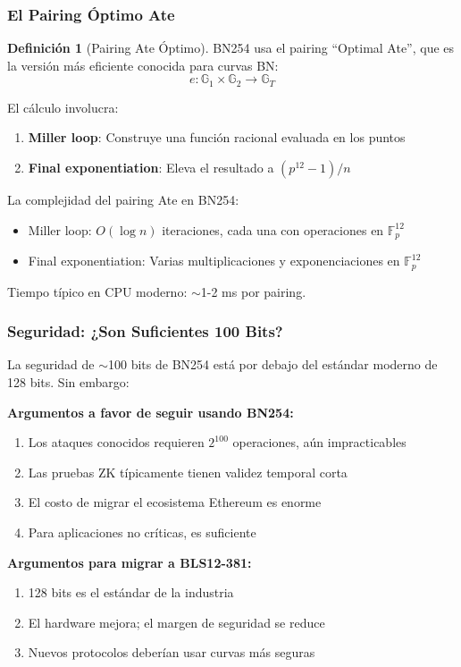 \documentclass[11pt,a4paper,twoside,openright]{book}
\theoremstyle{definition}
\newtheorem{definition}{Definición}[chapter]
\theoremstyle{plain}
\theoremstyle{remark}
\newcommand{\Fp}{\mathbb{F}_p}
\newcommand{\G}{\mathbb{G}}
\begin{document}
\subsubsection{El Pairing Óptimo Ate}

\begin{definition}[Pairing Ate Óptimo]
BN254 usa el pairing ``Optimal Ate'', que es la versión más eficiente conocida para curvas BN:
\[ e: \G_1 \times \G_2 \to \G_T \]

El cálculo involucra:
\begin{enumerate}
    \item \textbf{Miller loop}: Construye una función racional evaluada en los puntos
    \item \textbf{Final exponentiation}: Eleva el resultado a $(p^{12}-1)/n$
\end{enumerate}
\end{definition}

\begin{mathnote}
La complejidad del pairing Ate en BN254:
\begin{itemize}
    \item Miller loop: $O(\log n)$ iteraciones, cada una con operaciones en $\Fp^{12}$
    \item Final exponentiation: Varias multiplicaciones y exponenciaciones en $\Fp^{12}$
\end{itemize}

Tiempo típico en CPU moderno: $\sim$1-2 ms por pairing.
\end{mathnote}

\subsubsection{Seguridad: ¿Son Suficientes 100 Bits?}

\begin{advertencia}
La seguridad de $\sim$100 bits de BN254 está por debajo del estándar moderno de 128 bits. Sin embargo:

\textbf{Argumentos a favor de seguir usando BN254:}
\begin{enumerate}
    \item Los ataques conocidos requieren $2^{100}$ operaciones, aún impracticables
    \item Las pruebas ZK típicamente tienen validez temporal corta
    \item El costo de migrar el ecosistema Ethereum es enorme
    \item Para aplicaciones no críticas, es suficiente
\end{enumerate}

\textbf{Argumentos para migrar a BLS12-381:}
\begin{enumerate}
    \item 128 bits es el estándar de la industria
    \item El hardware mejora; el margen de seguridad se reduce
    \item Nuevos protocolos deberían usar curvas más seguras
\end{enumerate}
\end{advertencia}
\end{document}
